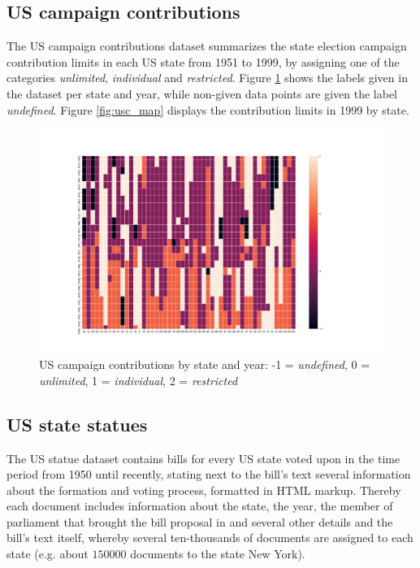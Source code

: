 \documentclass{custom_report}
\begin{document}
\subsection{US campaign contributions}
The US campaign contributions dataset summarizes the state election campaign contribution limits in each US state from 1951 to 1999, by assigning one of the categories \textit{unlimited}, \textit{individual} and \textit{restricted}. Figure \ref{fig:usc_grid} shows the labels given in the dataset per state and year, while non-given data points are given the label \textit{undefined}. Figure \ref{fig:usc_map} displays the contribution limits in 1999 by state.  

\begin{figure}[h!]
\begin{center}
\includegraphics[width=12cm]{images/usc_state_years.png}
\end{center}
\caption{US campaign contributions by state and year: -1 = \textit{undefined}, 0 = \textit{unlimited}, 1 = \textit{individual}, 2 = \textit{restricted}}
\label{fig:usc_grid}
\end{figure}

\subsection{US state statues}
The US statue dataset contains bills for every US state voted upon in the time period from 1950 until recently, stating next to the bill's text several information about the formation and voting process, formatted in HTML markup. Thereby each document includes information about the state, the year, the member of parliament that brought the bill proposal in and several other details and the bill's text itself, whereby several ten-thousands of documents are assigned to each state (e.g. about $150000$ documents to the state New York). 
\end{document}
